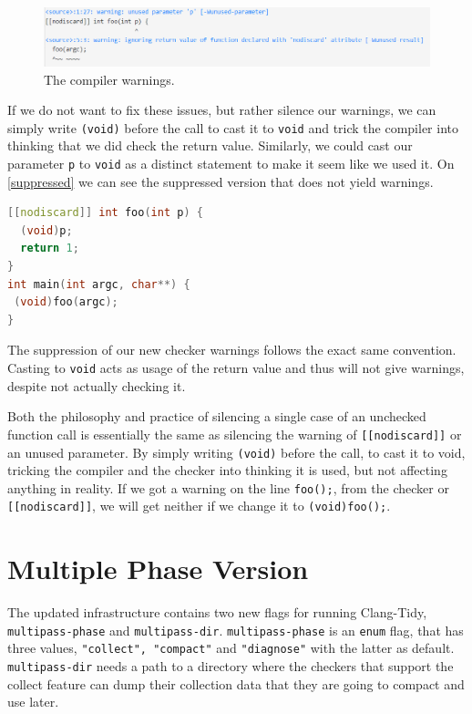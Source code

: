 \begin{figure}[H]
	\includegraphics[width=\linewidth]{images/nodiscard_warning.png}
	\caption{The compiler warnings.}
	\label{fig:compiler-warning}
\end{figure}

If we do not want to fix these issues, but rather silence our warnings, we can simply write \lstinline{(void)} before the call
to cast it to \lstinline{void} and trick the compiler into thinking that we did check the return value.
Similarly, we could cast our parameter \texttt{p} to \lstinline{void} as a distinct statement to make it seem like we used it. On \cref{suppressed}
we can see the suppressed version that does not yield warnings.

\begin{lstlisting}[language={C++},caption={The same example, now with suppressed warnings.},label={suppressed}]
[[nodiscard]] int foo(int p) {
  (void)p;
  return 1;
}
int main(int argc, char**) {
 (void)foo(argc);
}
\end{lstlisting}

The suppression of our new checker warnings follows the exact same convention. Casting to \lstinline{void} acts as usage of the return
value and thus will not give warnings, despite not actually checking it.

Both the philosophy and practice of silencing a single case of an unchecked function call is essentially the same as silencing the
warning of \texttt{[[nodiscard]]} or an unused parameter. By simply writing \lstinline{(void)} before the call, to cast it to void,
tricking the compiler and the checker into thinking it is used, but not affecting anything in reality.
If we got a warning on the line \lstinline{foo();}, from the checker or \texttt{[[nodiscard]]}, we will get neither if we change it
to \lstinline{(void)foo();}.

\section{Multiple Phase Version}

The updated infrastructure contains two new flags for running Clang-Tidy, \texttt{multipass-phase} and \texttt{multipass-dir}.
\texttt{multipass-phase} is an \lstinline{enum} flag, that has three values, \texttt{"collect", "compact"} and \texttt{"diagnose"}
with the latter as default.
\texttt{multipass-dir} needs a path to a directory where the checkers that support the collect feature can dump their collection data
that they are going to compact and use later.


